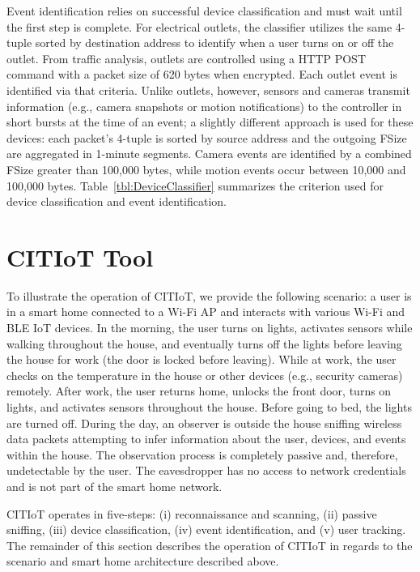 \documentclass[conference]{./IEEEtran/IEEEtran}
\begin{document}
Event identification relies on successful device classification and must wait until the first step is complete. For electrical outlets, the classifier utilizes the same 4-tuple sorted by destination address to identify when a user turns on or off the outlet. From traffic analysis, outlets are controlled using a HTTP POST command with a packet size of 620 bytes when encrypted. Each outlet event is identified via that criteria. Unlike outlets, however, sensors and cameras transmit information (e.g., camera snapshots or motion notifications) to the controller in short bursts at the time of an event; a slightly different approach is used for these devices: each packet's 4-tuple is sorted by source address and the outgoing \ac{FSize} are aggregated in 1-minute segments. Camera events are identified by a combined \ac{FSize} greater than 100,000 bytes, while motion events occur between 10,000 and 100,000 bytes. Table~\ref{tbl:DeviceClassifier} summarizes the criterion used for device classification and event identification.

\tableBtleDeviceShort
\tableDeviceClassifier

\section{\ac{CITIoT} Tool}\label{citiot}

To illustrate the operation of CITIoT, we provide the following scenario: a user is in a smart home connected to a Wi-Fi \ac{AP} and interacts with various Wi-Fi and \ac{BLE} \ac{IoT} devices. In the morning, the user turns on lights, activates sensors while walking throughout the house, and eventually turns off the lights before leaving the house for work (the door is locked before leaving). While at work, the user checks on the temperature in the house or other devices (e.g., security cameras) remotely. After work, the user returns home, unlocks the front door, turns on lights, and activates sensors throughout the house. Before going to bed, the lights are turned off. During the day, an observer is outside the house sniffing wireless data packets attempting to infer information about the user, devices, and events within the house. The observation process is completely passive and, therefore, undetectable by the user. The eavesdropper has no access to  network credentials and is not part of the smart home network. 

CITIoT operates in five-steps: (i) reconnaissance and scanning, (ii) passive sniffing, (iii) device classification, (iv) event identification, and (v) user tracking. The remainder of this section describes the operation of CITIoT in regards to the scenario and smart home architecture described above.
\end{document}
